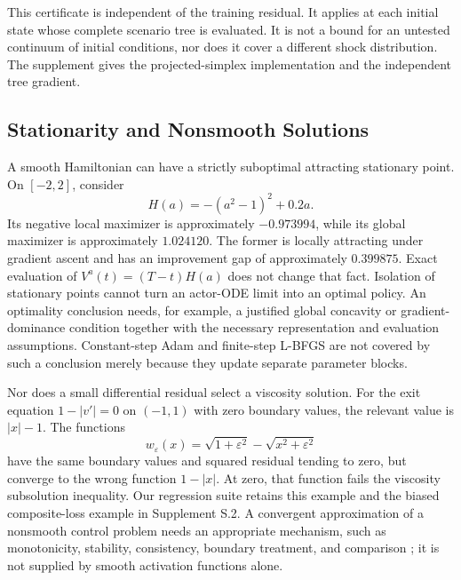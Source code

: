 This certificate is independent of the training residual. It applies at each initial state whose complete scenario tree is evaluated. It is not a bound for an untested continuum of initial conditions, nor does it cover a different shock distribution. The supplement gives the projected-simplex implementation and the independent tree gradient.

\subsection{Stationarity and Nonsmooth Solutions}
A smooth Hamiltonian can have a strictly suboptimal attracting stationary point. On $[-2,2]$, consider
\begin{equation}
 H(a)=-(a^2-1)^2+0.2a.
 \label{eq:counterexample}
\end{equation}
Its negative local maximizer is approximately $-0.973994$, while its global maximizer is approximately $1.024120$. The former is locally attracting under gradient ascent and has an improvement gap of approximately $0.399875$. Exact evaluation of $V^a(t)=(T-t)H(a)$ does not change that fact. Isolation of stationary points cannot turn an actor-ODE limit into an optimal policy. An optimality conclusion needs, for example, a justified global concavity or gradient-dominance condition together with the necessary representation and evaluation assumptions. Constant-step Adam and finite-step L-BFGS are not covered by such a conclusion merely because they update separate parameter blocks.

Nor does a small differential residual select a viscosity solution. For the exit equation $1-|v'|=0$ on $(-1,1)$ with zero boundary values, the relevant value is $|x|-1$. The functions
\begin{equation}
 w_\varepsilon(x)=\sqrt{1+\varepsilon^2}-\sqrt{x^2+\varepsilon^2}
 \label{eq:viscosity_counter}
\end{equation}
have the same boundary values and squared residual tending to zero, but converge to the wrong function $1-|x|$. At zero, that function fails the viscosity subsolution inequality. Our regression suite retains this example and the biased composite-loss example in Supplement S.2. A convergent approximation of a nonsmooth control problem needs an appropriate mechanism, such as monotonicity, stability, consistency, boundary treatment, and comparison \citep{barles1991}; it is not supplied by smooth activation functions alone.

